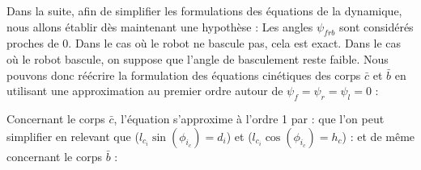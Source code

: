 				
					Dans la suite, afin de simplifier les formulations des équations de la dynamique, nous allons établir dès maintenant une hypothèse : Les angles $\psi_{frb}$ sont considérés proches de $0$.
					Dans le cas où le robot ne bascule pas, cela est exact. Dans le cas où le robot bascule, on suppose que l'angle de basculement reste faible.
					Nous pouvons donc réécrire la formulation des équations cinétiques des corps $\bar{c}$ et $\bar{b}$ en utilisant une approximation au premier ordre autour de $\psi_f=\psi_r=\psi_l=0$ :
					
					Concernant le corps $\bar{c}$, l'équation  s'approxime à l'ordre 1 par :
					que l'on peut simplifier en relevant  que ($l_{c_i}\sin(\phi_{i_c}) = d_i$) et ($l_{c_i}\cos(\phi_{i_c}) = h_c$) :
					et de même concernant le corps $\bar{b}$ :
					
